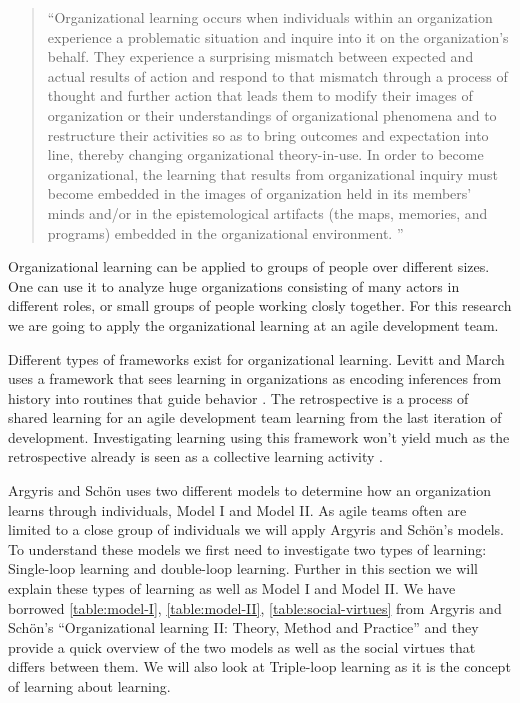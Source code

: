 \begin{quote}
	``Organizational learning occurs when individuals within an organization experience a problematic situation and inquire into it on the organization's behalf. They experience a surprising mismatch between expected and actual results of action and respond to that mismatch through a process of thought and further action that leads them to modify their images of organization or their understandings of organizational phenomena and to restructure their activities so as to bring outcomes and expectation into line, thereby changing organizational theory-in-use. In order to become organizational, the learning that results from organizational inquiry must become embedded in the images of organization held in its members' minds and/or in the epistemological artifacts (the maps, memories, and programs) embedded in the organizational environment. ''
\end{quote}

Organizational learning can be applied to groups of people over different sizes. One can use it to analyze huge organizations consisting of many actors in different roles, or small groups of people working closly together. For this research we are going to apply the organizational learning at an agile development team. 

Different types of frameworks exist for organizational learning. Levitt and March uses a framework that sees learning in organizations as encoding inferences from history into routines that guide behavior \cite{Levitt1988}. The retrospective is a process of shared learning for an agile development team learning from the last iteration of development. Investigating learning using this framework won't yield much as the retrospective already is seen as a collective learning activity \cite{Dingsoyr2004}. 

Argyris and Schön \cite{Argyris1996} uses two different models to determine how an organization learns through individuals, Model I and Model II. As agile teams often are limited to a close group of individuals we will apply Argyris and Schön's models. To understand these models we first need to investigate two types of learning: Single-loop learning and double-loop learning. Further in this section we will explain these types of learning as well as Model I and Model II. We have borrowed \autoref{table:model-I}, \autoref{table:model-II}, \autoref{table:social-virtues} from Argyris and Schön's ``Organizational learning II: Theory, Method and Practice''\cite{Argyris1996} and they provide a quick overview of the two models as well as the social virtues that differs between them. We will also look at Triple-loop learning as it is the concept of learning about learning. 

